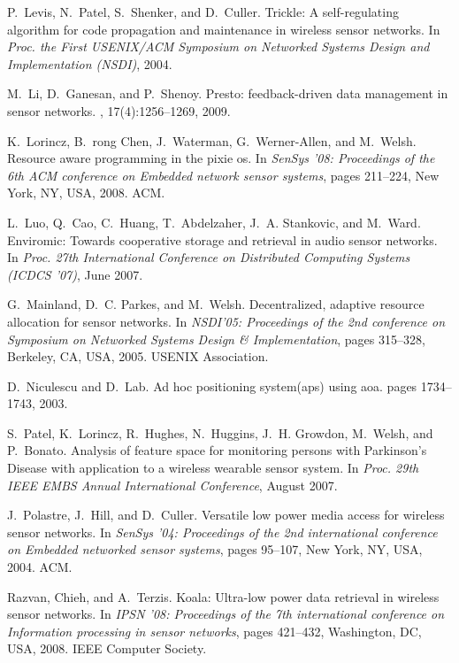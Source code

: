 \documentclass{sig-alternate}
\begin{document}
\begin{footnotesize}
\begin{thebibliography}{10}
P.~Levis, N.~Patel, S.~Shenker, and D.~Culler.
\newblock Trickle: {A} self-regulating algorithm for code propagation and
  maintenance in wireless sensor networks.
\newblock In {\em Proc. the First USENIX/ACM Symposium on Networked Systems
  Design and Implementation (NSDI)}, 2004.

M.~Li, D.~Ganesan, and P.~Shenoy.
\newblock Presto: feedback-driven data management in sensor networks.
, 17(4):1256--1269, 2009.

K.~Lorincz, B.~rong Chen, J.~Waterman, G.~Werner-Allen, and M.~Welsh.
\newblock Resource aware programming in the pixie os.
\newblock In {\em SenSys '08: Proceedings of the 6th ACM conference on Embedded
  network sensor systems}, pages 211--224, New York, NY, USA, 2008. ACM.

L.~Luo, Q.~Cao, C.~Huang, T.~Abdelzaher, J.~A. Stankovic, and M.~Ward.
\newblock Enviromic: Towards cooperative storage and retrieval in audio sensor
  networks.
\newblock In {\em Proc. 27th International Conference on Distributed Computing
  Systems (ICDCS '07)}, June 2007.

G.~Mainland, D.~C. Parkes, and M.~Welsh.
\newblock Decentralized, adaptive resource allocation for sensor networks.
\newblock In {\em NSDI'05: Proceedings of the 2nd conference on Symposium on
  Networked Systems Design \& Implementation}, pages 315--328, Berkeley, CA,
  USA, 2005. USENIX Association.

D.~Niculescu and D.~Lab.
\newblock Ad hoc positioning system(aps) using aoa.
\newblock pages 1734--1743, 2003.

S.~Patel, K.~Lorincz, R.~Hughes, N.~Huggins, J.~H. Growdon, M.~Welsh, and
  P.~Bonato.
\newblock Analysis of feature space for monitoring persons with {Parkinson's
  Disease} with application to a wireless wearable sensor system.
\newblock In {\em Proc. 29th IEEE EMBS Annual International Conference}, August
  2007.

J.~Polastre, J.~Hill, and D.~Culler.
\newblock Versatile low power media access for wireless sensor networks.
\newblock In {\em SenSys '04: Proceedings of the 2nd international conference
  on Embedded networked sensor systems}, pages 95--107, New York, NY, USA,
  2004. ACM.

Razvan, Chieh, and A.~Terzis.
\newblock Koala: Ultra-low power data retrieval in wireless sensor networks.
\newblock In {\em IPSN '08: Proceedings of the 7th international conference on
  Information processing in sensor networks}, pages 421--432, Washington, DC,
  USA, 2008. IEEE Computer Society.


\end{thebibliography}
\end{footnotesize}
\end{document}
